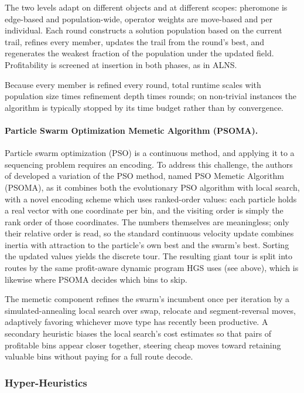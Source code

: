 \documentclass[orivec,runningheads]{llncs}
\begin{document}
The two levels adapt on different objects and at different scopes: pheromone is edge-based and population-wide, operator weights are move-based and per individual. Each round constructs a solution population based on the current trail, refines every member, updates the trail from the round's best, and regenerates the weakest fraction of the population under the updated field. Profitability is screened at insertion in both phases, as in ALNS.

Because every member is refined every round, total runtime scales with population size times refinement depth times rounds; on non-trivial instances the algorithm is typically stopped by its time budget rather than by convergence.

\paragraph{Particle Swarm Optimization Memetic Algorithm (PSOMA).}
Particle swarm optimization (PSO) is a continuous method, and applying it to a
sequencing problem requires an encoding. To address this challenge, the authors of \cite{inbook} developed a variation of the PSO method, named PSO Memetic Algorithm (PSOMA), as it combines both the evolutionary PSO algorithm with local search, with a novel encoding scheme which uses ranked-order values: each
particle holds a real vector with one coordinate per bin, and the visiting order
is simply the rank order of those coordinates. The numbers themselves are
meaningless; only their relative order is read, so the standard continuous
velocity update combines inertia with attraction to the particle's own best and
the swarm's best. Sorting the updated values yields the discrete tour. The
resulting giant tour is split into routes by the same
profit-aware dynamic program HGS uses (see above), which is likewise where PSOMA decides which bins to skip.

The memetic component refines the swarm's incumbent once per iteration by a
simulated-annealing local search over swap, relocate and segment-reversal moves,
adaptively favoring whichever move type has recently been productive. A
secondary heuristic biases the local search's cost estimates so that pairs of
profitable bins appear closer together, steering cheap moves toward retaining
valuable bins without paying for a full route decode.

\subsubsection{Hyper-Heuristics}
\end{document}

